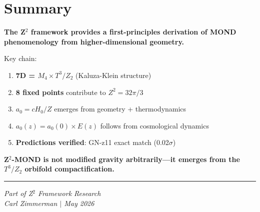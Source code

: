 \documentclass[12pt,a4paper]{article}
\begin{document}
\section{Summary}

\textbf{The Z$^2$ framework provides a first-principles derivation of MOND phenomenology from higher-dimensional geometry.}

Key chain:
\begin{enumerate}
\item \textbf{7D = $M_4 \times T^3/Z_2$} (Kaluza-Klein structure)
\item \textbf{8 fixed points} contribute to $Z^2 = 32\pi/3$
\item \textbf{$a_0 = cH_0/Z$} emerges from geometry + thermodynamics
\item \textbf{$a_0(z) = a_0(0) \times E(z)$} follows from cosmological dynamics
\item \textbf{Predictions verified}: GN-z11 exact match (0.02$\sigma$)
\end{enumerate}

\textbf{Z$^2$-MOND is not modified gravity arbitrarily---it emerges from the $T^3/Z_2$ orbifold compactification.}

\vspace{1cm}
\hrule
\vspace{0.5cm}
\textit{Part of Z$^2$ Framework Research}\\
\textit{Carl Zimmerman $|$ May 2026}
\end{document}

